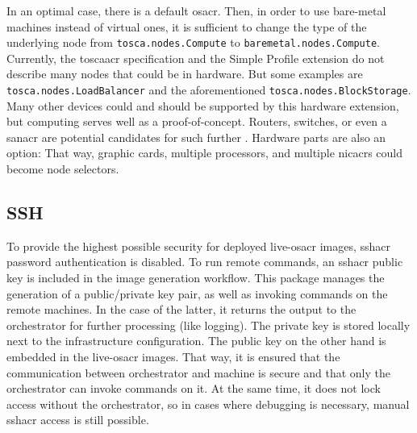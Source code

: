 \newline
In an optimal case, there is a default \gls{osacr}. Then, in order to use bare-metal machines instead of virtual ones, it is sufficient to change the type of the underlying node from \texttt{tosca.nodes.Compute} to \texttt{baremetal.nodes.Compute}.
\newline
Currently, the \gls{toscaacr} specification and the Simple Profile extension do not describe many nodes that could be  in hardware. But some examples are \texttt{tosca.nodes.LoadBalancer} and the aforementioned \texttt{tosca.nodes.BlockStorage}. Many other devices could and should be supported by this hardware extension, but computing serves well as a proof-of-concept. Routers, switches, or even a \gls{sanacr} are potential candidates for such further . Hardware parts are also an option: That way, graphic cards, multiple processors, and multiple \gls{nicacr}s could become node selectors.

\subsection{SSH}
\label{chap:ssh}
To provide the highest possible security for deployed live-\gls{osacr} images, \gls{sshacr} password authentication is disabled. To run remote commands, an \gls{sshacr} public key is included in the image generation workflow. This package manages the generation of a public/private key pair, as well as invoking commands on the remote machines. In the case of the latter, it returns the output to the orchestrator for further processing (like logging). The private key is stored locally next to the infrastructure configuration. The public key on the other hand is embedded in the live-\gls{osacr} images. That way, it is ensured that the communication between orchestrator and machine is secure and that only the orchestrator can invoke commands on it. At the same time, it does not lock access without the orchestrator, so in cases where debugging is necessary, manual \gls{sshacr} access is still possible.

